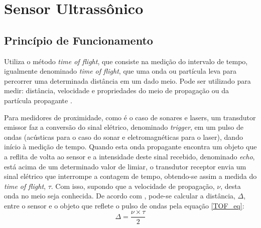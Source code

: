 \section{Sensor Ultrassônico}

\subsection{Princípio de Funcionamento}
Utiliza o método \textit{time of flight}, que consiste na medição do intervalo de tempo, igualmente denominado \textit{time of flight}, que uma onda 
ou partícula leva para percorrer uma determinada distância em um dado meio. 
Pode ser utilizado para medir: distância, velocidade \cite{TOF_velocity}e propriedades do meio de propagação ou da partícula propagante
\cite{TOF_medium1,TOF_medium2}.

Para medidores de proximidade, como é o caso de sonares e lasers, um transdutor emissor faz a conversão do sinal elétrico, denominado 
\textit{trigger}, em um pulso de ondas (acústicas para o caso do sonar e eletromagnéticas para o laser), dando início à medição de tempo.
Quando esta onda propagante encontra um objeto que a reflita de volta ao sensor e a intensidade deste sinal recebido, denominado \textit{echo}, está 
acima de um determinado valor de limiar, o transdutor receptor envia um sinal elétrico que interrompe a contagem de tempo, obtendo-se 
assim a medida do \textit{time of flight}, $\tau$.
Com isso, supondo que a velocidade de propagação, $\nu$, desta onda no meio seja conhecida. De acordo com \cite{siegwart}, pode-se 
calcular a distância, $\Delta$, entre o sensor e o objeto que reflete o pulso de ondas pela equação \ref{TOF_eq}:
\begin{equation}
 \label{TOF_eq}
 \Delta = \frac{\nu \times \tau }{2}
\end{equation}

